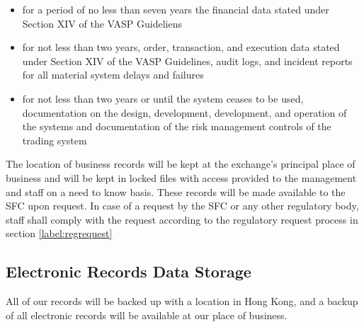 \begin{itemize}
  \item for a period of no less than seven years the financial data
    stated under Section XIV of the VASP Guideliens
  \item for not less than two years, order, transaction, and execution
    data stated under Section XIV of the VASP Guidelines, audit logs, and incident reports for all material system delays and failures
  \item for not less than two years or until the system ceases to be
    used, documentation on the design, development, development, and
    operation of the systems and documentation of the risk management
    controls of the trading system
\end{itemize}

The location of business records will be kept at the exchange's principal
place of business and will be kept in locked files with access
provided to the management and staff on a need to know basis.  These
records will be made available to the SFC upon request.  In case of a
request by the SFC or any other regulatory body, staff shall comply
with the request according to the regulatory request process in
section \ref{label:regrequest}

\subsection{Electronic Records Data Storage}
All of our records will be backed up with a location in Hong Kong, and
a backup of all electronic records will be available at our place of business.
